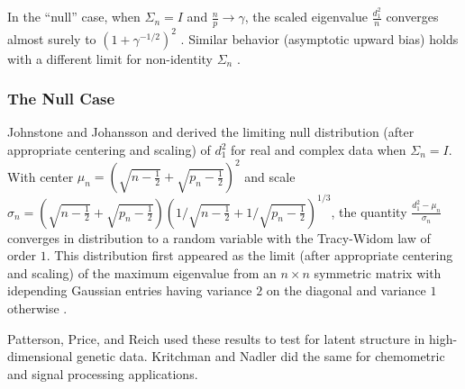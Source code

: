\documentclass{eoeauth}
\begin{document}
In the ``null'' case, when $\Sigma_n = I$ and $\tfrac{n}{p} \to \gamma$,
the scaled eigenvalue $\frac{d_1^2}{n}$ converges almost surely to
$(1 + \gamma^{-1/2})^2$ \cite{geman1980ltn,jonsson1983ole}.  Similar
behavior (asymptotic upward bias) holds with a different limit for
non-identity $\Sigma_n$
\cite{silverstein1984ole,yin1988lle,bai1988nle}. 

\subsubsection{The Null Case}

Johnstone \cite{johnstone2001dle} and Johansson \cite{johansson2000sfa}
and derived the limiting null distribution (after appropriate
centering and scaling) of $d_1^2$ for real and complex data when
$\Sigma_n = I$.  With center
$\mu_n = \left(\sqrt{n-\tfrac{1}{2}} + \sqrt{p_n - \tfrac{1}{2}}\right)^2$ and scale
$\sigma_n = \left(\sqrt{n-\tfrac{1}{2}} + \sqrt{p_n -
    \tfrac{1}{2}}\right) \left(1/\sqrt{n-\tfrac{1}{2}} + 1/\sqrt{p_n -
    \tfrac{1}{2}}\right)^{1/3}$, 
the quantity
\(
\frac{d^2_1 - \mu_n}{\sigma_n}
\)
converges in distribution to a random variable with the Tracy-Widom
law of order $1$.  This distribution first appeared as the limit
(after appropriate centering and scaling) of the maximum eigenvalue
from an $n \times n$ symmetric matrix with idepending Gaussian entries
having variance $2$ on the diagonal and variance $1$ otherwise
\cite{tracy1994lsd, tracy1996oas}.

Patterson, Price, and Reich \cite{patterson2006population} used these
results to test for latent structure in high-dimensional genetic
data.  Kritchman and Nadler \cite{kritchman2008determining,kritchman2009non} did the
same for chemometric and signal processing applications.
\end{document}

